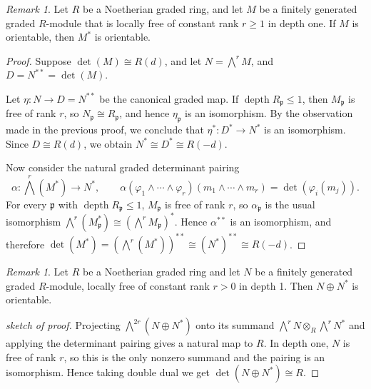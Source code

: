 \documentclass[11pt,letterpaper]{amsart}
\DeclareMathOperator{\depth}{depth}
\theoremstyle{plain}
\theoremstyle{definition}
\theoremstyle{remark}
\newtheorem{remark}[thm]{Remark}
\begin{document}
\begin{remark}
Let \(R\) be a Noetherian graded ring, and let \(M\) be a finitely generated graded \(R\)-module that is locally free of constant rank \(r\ge 1\) in depth one. If \(M\) is orientable, then \(M^*\) is orientable.
\end{remark}

\begin{proof}
Suppose \(\det(M)\cong R(d)\), and let \(N=\bigwedge^rM\), and \(D=N^{**}=\det(M)\). 

Let \(\eta:N\to D=N^{**}\) be the canonical graded map. If \(\depth R_\mathfrak p\leq1\), then \(M_\mathfrak p\) is free of rank \(r\), so \(N_\mathfrak p\cong R_\mathfrak p\), and hence \(\eta_\mathfrak p\) is an isomorphism. By the observation made in the previous proof, we conclude that \(\eta^*:D^*\to N^*\) is an isomorphism. Since \(D\cong R(d)\), we obtain $N^*\cong D^*\cong R(-d)$.

Now consider the natural graded determinant pairing
\[
\alpha:\bigwedge^r(M^*)\longrightarrow N^*,
\qquad
\alpha(\varphi_1\wedge\cdots\wedge\varphi_r)
(m_1\wedge\cdots\wedge m_r)
=\det(\varphi_i(m_j)).
\]
For every \(\mathfrak p\) with \(\depth R_\mathfrak p\leq1\), \(M_\mathfrak p\) is free of rank \(r\), so \(\alpha_\mathfrak p\) is the usual isomorphism
\(\bigwedge^r(M_\mathfrak p^*)\cong(\bigwedge^rM_\mathfrak p)^*\). Hence \(\alpha^{**}\) is an isomorphism, and therefore $
\det(M^*)=\left(\bigwedge^r(M^*)\right)^{**}
\cong (N^*)^{**}\cong R(-d)$.
\end{proof}

\begin{remark}\label{N+N*isorientable}
Let $R$ be a Noetherian graded ring and let $N$ be a finitely generated graded $R$-module, locally free of constant rank $r>0$ in depth 1. Then $N\oplus N^*$ is orientable.
\end{remark}
\begin{proof}[sketch of proof] Projecting \(\bigwedge^{2r}(N\oplus N^*)\) onto its summand \(\bigwedge^r N\otimes_R\bigwedge^r N^*\) and applying the determinant pairing gives a natural map to \(R\). In depth one, \(N\) is free of rank \(r\), so this is the only nonzero summand and the pairing is an isomorphism. Hence taking double dual we get \(\det(N\oplus N^*)\cong R\).
    
\end{proof}
\end{document}
